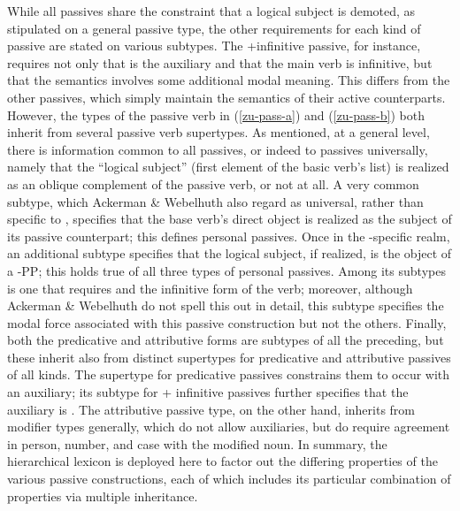 \documentclass[output=paper
 	        ,biblatex
                ,babelshorthands
                ,newtxmath
                ,draftmode
                ,colorlinks, citecolor=brown
]{langscibook}
\begin{document}
While all passives share the constraint that a logical subject is demoted, as stipulated on a general  passive type, the other requirements for each kind of passive are stated on various subtypes.
The +infinitive passive, for instance, requires not only that  is the auxiliary and that the main verb is infinitive, but that the semantics involves some additional modal meaning.
This differs from the other passives, which simply maintain the semantics of their active counterparts.
However, the types of the passive verb  in (\ref{zu-pass-a}) and (\ref{zu-pass-b}) both inherit from several passive verb supertypes.
As mentioned, at a general level, there is information common to all  passives, or indeed to passives universally, namely that the ``logical subject'' (first element of the basic verb's  list) is realized as an oblique complement of the passive verb, or not at all.
A very common subtype, which Ackerman \& Webelhuth also regard as universal, rather than specific to , specifies that the base verb's direct object is realized as the subject of its passive counterpart; this defines personal passives.
Once in the -specific realm, an additional subtype specifies that the logical subject, if realized, is the object of a -PP; this holds true of all three types of  personal passives.
Among its subtypes is one that requires  and the infinitive form of the verb; moreover, although Ackerman \& Webelhuth do not spell this out in detail, this subtype specifies the modal force associated with this passive construction but not the others.
Finally, both the predicative and attributive forms are subtypes of all the preceding, but these inherit also from distinct supertypes for predicative and attributive passives of all kinds.
The supertype for predicative passives constrains them to occur with an auxiliary; its subtype for  + infinitive passives further specifies that the auxiliary is .
The attributive passive type, on the other hand, inherits from modifier types generally, which do not allow auxiliaries, but do require agreement in person, number, and case with the modified noun.
In summary, the hierarchical lexicon is deployed here to factor out the differing properties of the
various  passive constructions, each of which includes its particular combination of
properties via multiple inheritance.%
%
\end{document}
